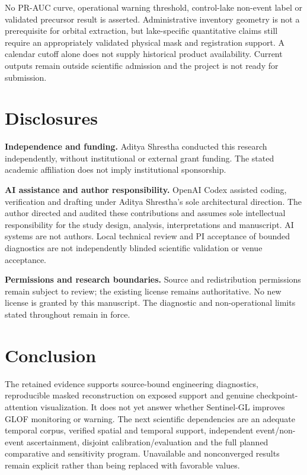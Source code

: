 \documentclass[10pt,twocolumn]{article}
\begin{document}
No PR-AUC curve, operational warning threshold, control-lake non-event label or validated precursor result is asserted. Administrative inventory geometry is not a prerequisite for orbital extraction, but lake-specific quantitative claims still require an appropriately validated physical mask and registration support. A calendar cutoff alone does not supply historical product availability. Current outputs remain outside scientific admission and the project is not ready for submission.

\section{Disclosures}
\noindent\textbf{Independence and funding.} Aditya Shrestha conducted this research independently, without institutional or external grant funding. The stated academic affiliation does not imply institutional sponsorship.

\noindent\textbf{AI assistance and author responsibility.} OpenAI Codex assisted coding, verification and drafting under Aditya Shrestha's sole architectural direction. The author directed and audited these contributions and assumes sole intellectual responsibility for the study design, analysis, interpretations and manuscript. AI systems are not authors. Local technical review and PI acceptance of bounded diagnostics are not independently blinded scientific validation or venue acceptance.

\noindent\textbf{Permissions and research boundaries.} Source and redistribution permissions remain subject to review; the existing license remains authoritative. No new license is granted by this manuscript. The diagnostic and non-operational limits stated throughout remain in force.

\section{Conclusion}
The retained evidence supports source-bound engineering diagnostics, reproducible masked reconstruction on exposed support and genuine checkpoint-attention visualization. It does not yet answer whether Sentinel-GL improves GLOF monitoring or warning. The next scientific dependencies are an adequate temporal corpus, verified spatial and temporal support, independent event/non-event ascertainment, disjoint calibration/evaluation and the full planned comparative and sensitivity program. Unavailable and nonconverged results remain explicit rather than being replaced with favorable values.
\end{document}
